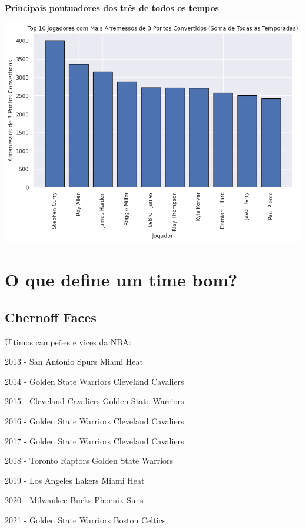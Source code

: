 \documentclass[
]{book}
\begin{document}
\textbf{Principais pontuadores dos três de todos os tempos}

\includegraphics{imagens/19.png}

\hypertarget{o-que-define-um-time-bom}{%
\chapter{O que define um time bom?}\label{o-que-define-um-time-bom}}

\hypertarget{chernoff-faces}{%
\section{Chernoff Faces}\label{chernoff-faces}}

Últimos campeões e vices da NBA:

2013 - San Antonio Spurs \textbar{} Miami Heat

2014 - Golden State Warriors \textbar{} Cleveland Cavaliers

2015 - Cleveland Cavaliers \textbar{} Golden State Warriors

2016 - Golden State Warriors \textbar{} Cleveland Cavaliers

2017 - Golden State Warriors \textbar{} Cleveland Cavaliers

2018 - Toronto Raptors \textbar{} Golden State Warriors

2019 - Los Angeles Lakers \textbar{} Miami Heat

2020 - Milwaukee Bucks \textbar{} Phoenix Suns

2021 - Golden State Warriors \textbar{} Boston Celtics
\end{document}
